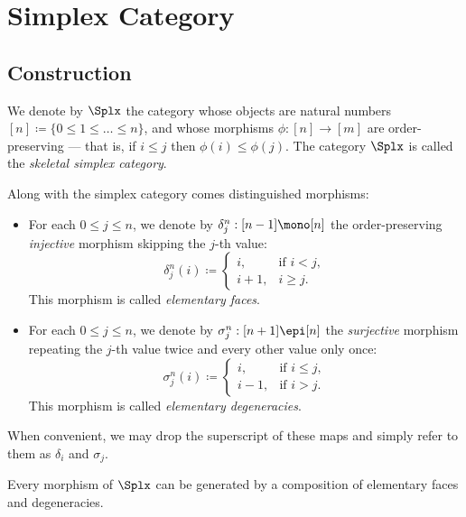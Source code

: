 \section{Simplex Category}

\subsection{Construction}

\begin{definition}
\label{def:skeletal-simplex-category}
We denote by \(\Splx\) the category whose objects are natural numbers
\([n] \coloneq \{0 \leq 1 \leq \dots \leq n\}\), and whose morphisms
\(\phi: [n] \to [m]\) are order-preserving --- that is, if \(i \leq j\) then
\(\phi(i) \leq \phi(j)\). The category \(\Splx\) is called the \emph{skeletal
  simplex category}.

Along with the simplex category comes distinguished morphisms:
\begin{itemize}\setlength\itemsep{0em}
\item For each \(0 \leq j \leq n\), we denote by
  \(\delta_j^n: [n - 1] \mono [n]\) the order-preserving \emph{injective}
  morphism skipping the \(j\)-th value:
  \[
  \delta_j^n(i) \coloneq
  \begin{cases}
    i, &\text{if } i < j, \\
    i + 1, &i \geq j.
  \end{cases}
  \]
  This morphism is called \emph{elementary faces}.

\item For each \(0 \leq j \leq n\), we denote by
  \(\sigma_j^n: [n + 1] \epi [n]\) the \emph{surjective} morphism repeating the
  \(j\)-th value twice and every other value only once:
  \[
  \sigma_j^n(i) \coloneq
  \begin{cases}
    i, &\text{if } i \leq j, \\
    i - 1, &\text{if } i > j.
  \end{cases}
  \]
  This morphism is called \emph{elementary degeneracies}.
\end{itemize}
When convenient, we may drop the superscript of these maps and simply refer to
them as \(\delta_i\) and \(\sigma_j\).
\end{definition}

\begin{lemma}
\label{lem:elementary-maps-generate-simplex-maps}
Every morphism of \(\Splx\) can be generated by a composition of elementary
faces and degeneracies.
\end{lemma}

